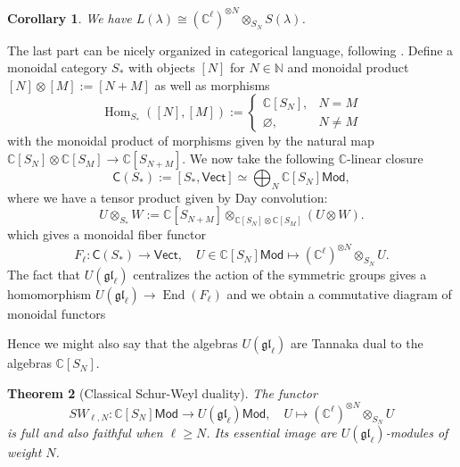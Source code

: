 \documentclass[11pt]{report}
\newtheorem{theorem}{Theorem}[section]
\newtheorem{corollary}[theorem]{Corollary}
\theoremstyle{definition}
\theoremstyle{remark}
\theoremstyle{remark}
\newcommand{\Hom}{\operatorname{Hom}}
\newcommand{\End}{\operatorname{End}}
\newcommand{\N}{\mathbb{N}}
\newcommand{\C}{\mathbb{C}}
\begin{document}
\begin{corollary}\label{corollary:SchurWeyl}
We have $L(\lambda) \cong (\C^\ell)^{\otimes N} \otimes_{S_N} S(\lambda)$.
\end{corollary}

The last part can be nicely organized in categorical language, following \cite{article:davydov:2010}. Define a monoidal category $S_*$ with objects $[N]$ for $N \in \N$ and monoidal product $[N] \otimes [M] := [N+M]$ as well as morphisms
\begin{equation*}
\Hom_{S_*}([N],[M]) :=
\begin{cases}
\C[S_N], & N = M \\
\varnothing, & N \neq M
\end{cases}
\end{equation*}
with the monoidal product of morphisms given by the natural map $\C[S_N] \otimes \C[S_M] \to \C[S_{N+M}]$. We now take the following $\C$-linear closure
\begin{equation*}
\mathsf{C}(S_*) := [S_*,\mathsf{Vect}] \simeq \bigoplus_N \C[S_N]\mathsf{Mod},
\end{equation*}
where we have a tensor product given by Day convolution:
\begin{equation*}
U \otimes_{S_*} W := \C[S_{N+M}] \otimes_{\C[S_N] \otimes \C[S_M]} (U \otimes W).
\end{equation*}
which gives a monoidal fiber functor
\begin{equation*}
F_\ell: \mathsf{C}(S_*) \to \mathsf{Vect}, \quad U \in \C[S_N]\mathsf{Mod} \mapsto (\C^\ell)^{\otimes N} \otimes_{S_N} U.
\end{equation*}
The fact that $U(\mathfrak{gl}_\ell)$ centralizes the action of the symmetric groups gives a homomorphism $U(\mathfrak{gl}_\ell) \to \End(F_\ell)$ and we obtain a commutative diagram of monoidal functors
\begin{center}
\end{center}
Hence we might also say that the algebras $U(\mathfrak{gl}_\ell)$ are Tannaka dual to the algebras $\C[S_N]$.

\begin{theorem}[Classical Schur-Weyl duality]
The functor
\begin{equation*}
SW_{\ell,N}: \C[S_N]\mathsf{Mod} \to U(\mathfrak{gl}_\ell)\mathsf{Mod}, \quad U \mapsto (\C^\ell)^{\otimes N} \otimes_{S_N} U
\end{equation*}
is full and also faithful when $\ell \geq N$. Its essential image are $U(\mathfrak{gl}_\ell)$-modules of weight $N$.
\end{theorem}
\end{document}
